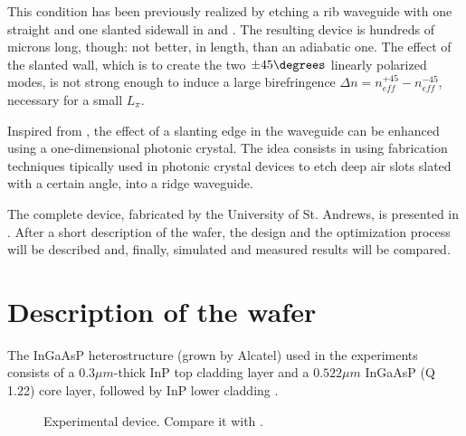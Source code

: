 This condition has been previously realized by etching a rib waveguide with one
straight and one slanted sidewall in \cite{elrefaei_slanted} and
\cite{elrefaei_optimized}. The resulting device is hundreds of microns
long, though: not better, in length, than an adiabatic one. The
effect of the slanted wall, which is to create the two $\pm
45\degrees$ linearly polarized modes, is not strong enough to induce
a large birefringence $\Delta n = n_{eff}^{+45} - n_{eff}^{-45}$, necessary for a small
$L_\pi$.

Inspired from \cite{cai_ultra}, the effect of a slanting edge
in the waveguide can be enhanced using a one-dimensional photonic
crystal. The idea consists in using fabrication techniques tipically
used in photonic crystal devices to etch deep air slots slated with a
certain angle, into a ridge waveguide.

The complete device, fabricated by the University of St. Andrews, is
presented in \cite{kotlyar_compact}. After a short description of the
wafer, the design and the optimization process will be described and,
finally, simulated and measured results will be compared.

\section{Description of the wafer}

The InGaAsP heterostructure (grown by Alcatel) used in the experiments
consists of a $0.3 \mu m$-thick InP top cladding layer and a $0.522
\mu m$ InGaAsP (Q 1.22) core layer, followed by InP lower cladding
.

\begin{figure}[htbp]
  \begin{center}
  \end{center}
  \caption{Experimental device. Compare it with .}
  \label{fig:polrot_experimental_device}
\end{figure}

